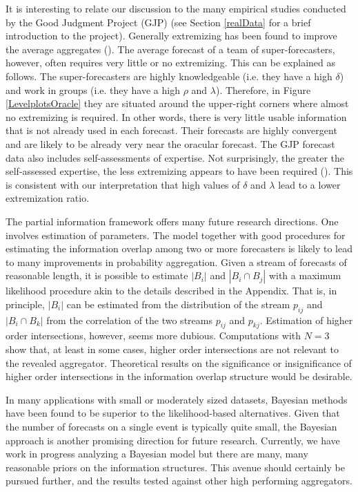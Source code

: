 \documentclass[11pt]{article}
\theoremstyle{definition}
\theoremstyle{definition}
\begin{document}
It is interesting to relate our discussion to the many empirical
studies conducted by the Good Judgment Project (GJP) (see Section
\ref{realData} for a brief introduction to the project).  Generally
extremizing has been found to improve the average aggregates
(\citealt{mellers2014psychological, satopaa, satopaa2014probability}).
The average forecast of a team of super-forecasters, however, often
requires very little or no extremizing.  This can be explained as follows.  The super-forecasters are
highly knowledgeable (i.e. they have a high $\delta$) and
work in groups (i.e. they have a high $\rho$ and $\lambda$).  Therefore, in
Figure \ref{LevelplotsOracle} they are situated around the upper-right
corners where almost no extremizing is required.  In other words,
there is very little usable information that is not already used in each
forecast.  Their forecasts are highly convergent and are likely to be
already very near the oracular forecast.  The GJP forecast data also
includes self-assessments of expertise.  Not surprisingly, the greater
the self-assessed expertise, the less extremizing appears to have been
required (\citealt{satopaa}).  This is consistent with our interpretation that high values
of $\delta$ and $\lambda$ lead to a lower extremization ratio.

The partial information framework offers many future research
directions.  One involves estimation of parameters.  The model together with good procedures for estimating
the information overlap among two or more forecasters is likely to lead to many
improvements in probability aggregation. Given a stream of forecasts
of reasonable length, it is possible to estimate $|B_i|$ and $|B_i
\cap B_j|$ with a maximum likelihood procedure akin to the details
described in the Appendix. That is, in principle, $|B_i|$ can be
estimated from the distribution of the stream $p_{ij}$ and $|B_i \cap B_k|$ from the correlation of the two streams $p_{ij}$ and $p_{kj}$.  Estimation of higher order intersections, however, seems more
dubious.  Computations with $N=3$ show that, at least in some cases,
higher order intersections are not relevant to the revealed
aggregator.  Theoretical results on the significance or insignificance
of higher order intersections in the information overlap structure
would be desirable.

In many applications with small or moderately sized datasets, Bayesian methods have been found to be superior to the likelihood-based alternatives. Given that the number of forecasts on a single event is typically quite small, the Bayesian approach is another promising direction for future research. Currently, we have
work in progress analyzing a Bayesian model but there are many, many
reasonable priors on the information structures. 
 This avenue should
certainly be pursued further, and the results tested against other high
performing aggregators.
\end{document}
